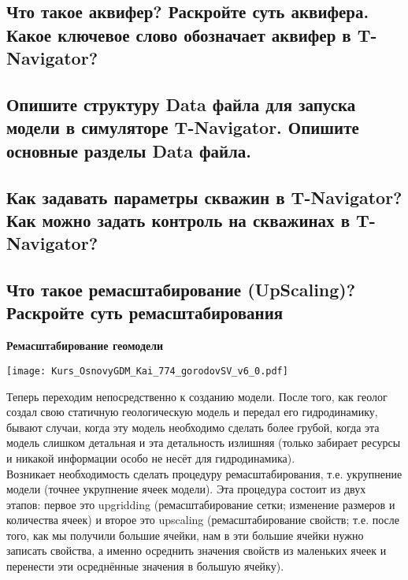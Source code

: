 \documentclass[main.tex]{subfiles}
\begin{document}
\newpage

\subsection{Что такое аквифер? Раскройте суть аквифера. Какое ключевое слово обозначает аквифер в T-Navigator?}

\newpage

\subsection{Опишите структуру Data файла для запуска модели в симуляторе T-Navigator. Опишите основные разделы Data файла.}

\newpage

\subsection{Как задавать параметры скважин в T-Navigator? Как можно задать контроль на скважинах в T-Navigator?}

\newpage

\subsection{Что такое ремасштабирование (UpScaling)? Раскройте суть ремасштабирования}

\textbf{Ремасштабирование геомодели}

\texttt{[image: Kurs\_OsnovyGDM\_Kai\_774\_gorodovSV\_v6\_0.pdf]}

Теперь переходим непосредственно к созданию модели.
После того, как геолог создал свою статичную геологическую модель и передал его гидродинамику, бывают случаи, когда эту модель необходимо сделать более грубой, когда эта модель слишком детальная и эта детальность излишняя (только забирает ресурсы и никакой информации особо не несёт для гидродинамика).
\\

Возникает необходимость сделать процедуру ремасштабирования, т.е. укрупнение модели (точнее укрупнение ячеек модели).
Эта процедура состоит из двух этапов: первое это upgridding (ремасштабирование сетки; изменение размеров и количества ячеек) и второе это upscaling (ремасштабирование свойств; т.е. после того, как мы получили большие ячейки, нам в эти большие ячейки нужно записать свойства, а именно осреднить значения свойств из маленьких ячеек и перенести эти осреднённые значения в большую ячейку).
\\
\end{document}
